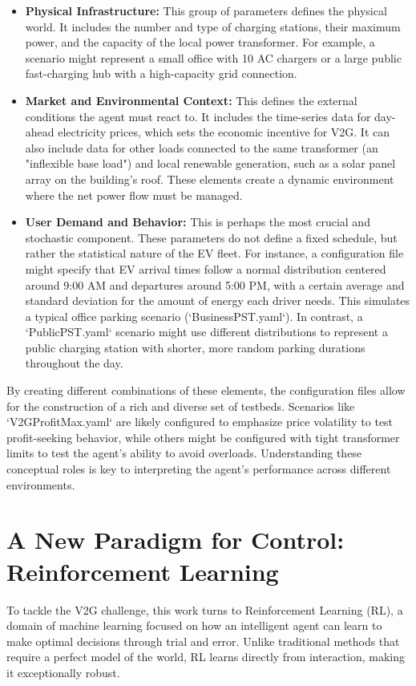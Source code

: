 \begin{itemize}
    \item \textbf{Physical Infrastructure:} This group of parameters defines the physical world. It includes the number and type of charging stations, their maximum power, and the capacity of the local power transformer. For example, a scenario might represent a small office with 10 AC chargers or a large public fast-charging hub with a high-capacity grid connection.
    
    \item \textbf{Market and Environmental Context:} This defines the external conditions the agent must react to. It includes the time-series data for day-ahead electricity prices, which sets the economic incentive for V2G. It can also include data for other loads connected to the same transformer (an "inflexible base load") and local renewable generation, such as a solar panel array on the building's roof. These elements create a dynamic environment where the net power flow must be managed.
    
    \item \textbf{User Demand and Behavior:} This is perhaps the most crucial and stochastic component. These parameters do not define a fixed schedule, but rather the statistical nature of the EV fleet. For instance, a configuration file might specify that EV arrival times follow a normal distribution centered around 9:00 AM and departures around 5:00 PM, with a certain average and standard deviation for the amount of energy each driver needs. This simulates a typical office parking scenario (`BusinessPST.yaml`). In contrast, a `PublicPST.yaml` scenario might use different distributions to represent a public charging station with shorter, more random parking durations throughout the day.
\end{itemize}
By creating different combinations of these elements, the configuration files allow for the construction of a rich and diverse set of testbeds. Scenarios like `V2GProfitMax.yaml` are likely configured to emphasize price volatility to test profit-seeking behavior, while others might be configured with tight transformer limits to test the agent's ability to avoid overloads. Understanding these conceptual roles is key to interpreting the agent's performance across different environments.

\section{A New Paradigm for Control: Reinforcement Learning}
To tackle the V2G challenge, this work turns to Reinforcement Learning (RL), a domain of machine learning focused on how an intelligent agent can learn to make optimal decisions through trial and error. Unlike traditional methods that require a perfect model of the world, RL learns directly from interaction, making it exceptionally robust.

